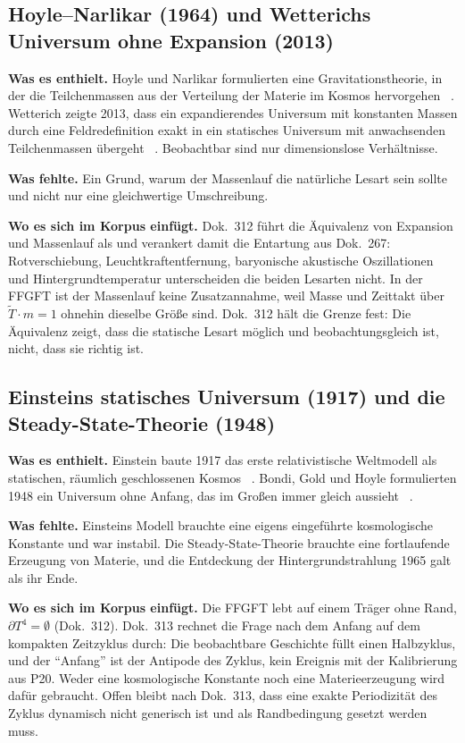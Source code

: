 \subsection{Hoyle--Narlikar (1964) und Wetterichs Universum ohne Expansion (2013)}

\textbf{Was es enthielt.} Hoyle und Narlikar formulierten eine Gravitationstheorie, in der die
Teilchenmassen aus der Verteilung der Materie im Kosmos hervorgehen \QM~\cite{HoyleNarlikar1964}.
Wetterich zeigte 2013, dass ein expandierendes Universum mit konstanten Massen durch eine
Feldredefinition exakt in ein statisches Universum mit anwachsenden Teilchenmassen übergeht
\QM~\cite{Wetterich2013}. Beobachtbar sind nur dimensionslose Verhältnisse.

\textbf{Was fehlte.} Ein Grund, warum der Massenlauf die natürliche Lesart sein sollte und nicht
nur eine gleichwertige Umschreibung.

\textbf{Wo es sich im Korpus einfügt.} Dok.~312 führt die Äquivalenz von Expansion und Massenlauf
als \KM{} und verankert damit die Entartung aus Dok.~267: Rotverschiebung, Leuchtkraftentfernung,
baryonische akustische Oszillationen und Hintergrundtemperatur unterscheiden die beiden Lesarten
nicht. In der FFGFT ist der Massenlauf keine Zusatzannahme, weil Masse und Zeittakt über
$\tilde T\cdot m=1$ ohnehin dieselbe Größe sind. Dok.~312 hält die Grenze fest: Die Äquivalenz
zeigt, dass die statische Lesart möglich und beobachtungsgleich ist, nicht, dass sie richtig ist.

\subsection{Einsteins statisches Universum (1917) und die Steady-State-Theorie (1948)}

\textbf{Was es enthielt.} Einstein baute 1917 das erste relativistische Weltmodell als statischen,
räumlich geschlossenen Kosmos \QM~\cite{Einstein1917}. Bondi, Gold und Hoyle formulierten 1948 ein
Universum ohne Anfang, das im Großen immer gleich aussieht \QM~\cite{BondiGold1948,Hoyle1948}.

\textbf{Was fehlte.} Einsteins Modell brauchte eine eigens eingeführte kosmologische Konstante und
war instabil. Die Steady-State-Theorie brauchte eine fortlaufende Erzeugung von Materie, und die
Entdeckung der Hintergrundstrahlung 1965 galt als ihr Ende.

\textbf{Wo es sich im Korpus einfügt.} Die FFGFT lebt auf einem Träger ohne Rand,
$\partial T^4=\emptyset$ (Dok.~312). Dok.~313 rechnet die Frage nach dem Anfang auf dem kompakten
Zeitzyklus durch: Die beobachtbare Geschichte füllt einen Halbzyklus, und der
\enquote{Anfang} ist der Antipode des Zyklus, kein Ereignis \KM{} mit der Kalibrierung aus P20.
Weder eine kosmologische Konstante noch eine Materieerzeugung wird dafür gebraucht. Offen bleibt
nach Dok.~313, dass eine exakte Periodizität des Zyklus dynamisch nicht generisch ist und als
Randbedingung gesetzt werden muss.

